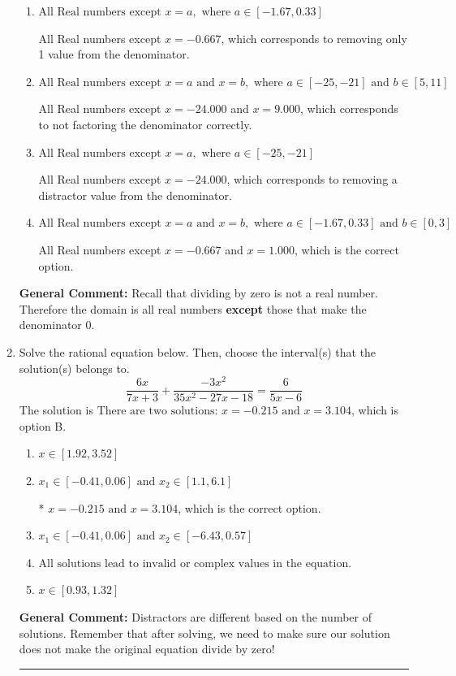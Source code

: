 \documentclass{extbook}[14pt]
\newcommand{\litem}[1]{\item #1

\rule{\textwidth}{0.4pt}}
\begin{document}
\begin{enumerate}
{\begin{enumerate}[label=\Alph*.]
This corresponds to thinking the denominator has complex roots or that rational functions have a domain of all Real numbers.
\item \( \text{All Real numbers except } x = a, \text{ where } a \in [-1.67, 0.33] \)

All Real numbers except $x = -0.667$, which corresponds to removing only 1 value from the denominator.
\item \( \text{All Real numbers except } x = a \text{ and } x = b, \text{ where } a \in [-25, -21] \text{ and } b \in [5, 11] \)

All Real numbers except $x = -24.000$ and $x = 9.000$, which corresponds to not factoring the denominator correctly.
\item \( \text{All Real numbers except } x = a, \text{ where } a \in [-25, -21] \)

All Real numbers except $x = -24.000$, which corresponds to removing a distractor value from the denominator.
\item \( \text{All Real numbers except } x = a \text{ and } x = b, \text{ where } a \in [-1.67, 0.33] \text{ and } b \in [0, 3] \)

All Real numbers except $x = -0.667$ and $x = 1.000$, which is the correct option.
\end{enumerate}

\textbf{General Comment:} Recall that dividing by zero is not a real number. Therefore the domain is all real numbers \textbf{except} those that make the denominator 0.
}
\litem{
Solve the rational equation below. Then, choose the interval(s) that the solution(s) belongs to.
\[ \frac{6x}{7x + 3} + \frac{-3x^{2}}{35x^{2} -27 x -18} = \frac{6}{5x -6} \]The solution is \( \text{There are two solutions: } x = -0.215 \text{ and } x = 3.104 \), which is option B.\begin{enumerate}[label=\Alph*.]
\item \( x \in [1.92,3.52] \)


\item \( x_1 \in [-0.41, 0.06] \text{ and } x_2 \in [1.1,6.1] \)

* $x = -0.215 \text{ and } x = 3.104$, which is the correct option.
\item \( x_1 \in [-0.41, 0.06] \text{ and } x_2 \in [-6.43,0.57] \)


\item \( \text{All solutions lead to invalid or complex values in the equation.} \)


\item \( x \in [0.93,1.32] \)


\end{enumerate}

\textbf{General Comment:} Distractors are different based on the number of solutions. Remember that after solving, we need to make sure our solution does not make the original equation divide by zero!
}
\end{enumerate}
\end{document}
